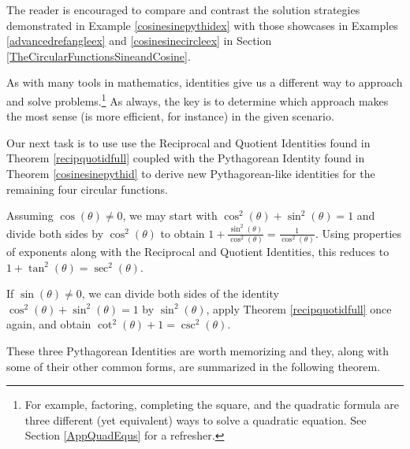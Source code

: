 \documentclass{ximera}
\begin{document}
\smallskip

The reader is encouraged to compare and contrast the solution strategies demonstrated in Example \ref{cosinesinepythidex} with those showcases in Examples \ref{advancedrefangleex} and \ref{cosinesinecircleex} in Section \ref{TheCircularFunctionsSineandCosine}.  

\smallskip

As with many tools in mathematics, identities give us a different way to approach and solve problems.\footnote{For example, factoring, completing the square, and the quadratic formula are three different (yet equivalent) ways to solve a quadratic equation.  See Section \ref{AppQuadEqus} for a refresher.}  As always, the key is to determine which approach makes the most sense (is more efficient, for instance) in the given scenario.  

\smallskip


Our next task is to use use the Reciprocal and Quotient Identities found in Theorem \ref{recipquotidfull} coupled with the Pythagorean Identity found in Theorem \ref{cosinesinepythid} to derive new Pythagorean-like identities for the remaining four circular functions.   

\smallskip

Assuming $\cos(\theta) \neq 0$, we may start with $\cos^{2}(\theta) + \sin^{2}(\theta) = 1$ and divide both sides by $\cos^{2}(\theta)$ to obtain $1 + \frac{\sin^{2}(\theta)}{\cos^{2}(\theta)} = \frac{1}{\cos^{2}(\theta)}$.  Using properties of exponents along with the Reciprocal and Quotient Identities, this reduces to $1 + \tan^{2}(\theta) = \sec^{2}(\theta)$. 

\smallskip

 If $\sin(\theta) \neq 0$, we can divide both sides of the identity $\cos^{2}(\theta) + \sin^{2}(\theta) = 1$ by $\sin^{2}(\theta)$, apply Theorem \ref{recipquotidfull} once again,  and obtain $\cot^{2}(\theta) + 1 = \csc^{2}(\theta)$.  
 
 \smallskip
 
 These three Pythagorean Identities are worth memorizing and they, along with some of their other common forms, are summarized in the following theorem.

\smallskip

\end{document}
